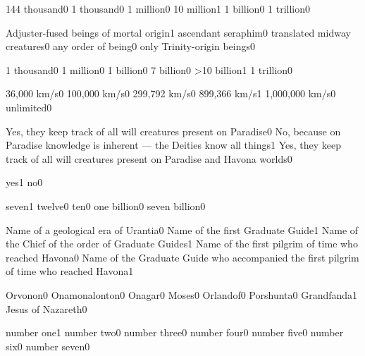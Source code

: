 {144 thousand}{0}
{1 thousand}{0}
{1 million}{0}
{10 million}{1}
{1 billion}{0}
{1 trillion}{0}
\qstop

{Adjuster-fused beings of mortal origin}{1}
{ascendant seraphim}{0}
{translated midway creatures}{0}
{any order of being}{0}
{only Trinity-origin beings}{0}
\qstop

{1 thousand}{0}
{1 million}{0}
{1 billion}{0}
{7 billion}{0}
{>10 billion}{1}
{1 trillion}{0}
\qstop


{36,000 km/s}{0}
{100,000 km/s}{0}
{299,792 km/s}{0}
{899,366 km/s}{1}
{1,000,000 km/s}{0}
{unlimited}{0}
\qstop


{Yes, they keep track of all will creatures present on Paradise}{0}
{No, because on Paradise knowledge is inherent --- the Deities know all things}{1}
{Yes, they keep track of all will creatures present on Paradise and Havona worlds}{0}
\qstop

{yes}{1}
{no}{0}
\qstop

{seven}{1}
{twelve}{0}
{ten}{0}
{one billion}{0}
{seven billion}{0}
\qstop

{Name of a geological era of Urantia}{0}
{Name of the first Graduate Guide}{1}
{Name of the Chief of the order of Graduate Guides}{1}
{Name of the first pilgrim of time who reached Havona}{0}
{Name of the Graduate Guide who accompanied the first pilgrim of time who reached Havona}{1}
\qstop

{Orvonon}{0}
{Onamonalonton}{0}
{Onagar}{0}
{Moses}{0}
{Orlandof}{0}
{Porshunta}{0}
{Grandfanda}{1}
{Jesus of Nazareth}{0}
\qstop

{number one}{1}
{number two}{0}
{number three}{0}
{number four}{0}
{number five}{0}
{number six}{0}
{number seven}{0}
\qstop

